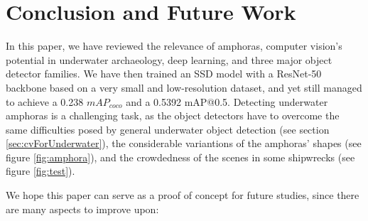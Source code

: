 \documentclass[a4paper, 11pt, oneside]{article}
\begin{document}
  \clearpage

  \section{Conclusion and Future Work}

  In this paper, we have reviewed the relevance of amphoras, computer vision's potential in underwater archaeology, deep
  learning, and three major object detector families. We have then trained an SSD model with a ResNet-50 backbone
  based on a very small and low-resolution dataset, and yet still managed to achieve a 0.238 $mAP_{coco}$ and a 0.5392
  mAP@0.5. Detecting underwater amphoras is a challenging task, as the object detectors have to overcome the same
  difficulties posed by general underwater object detection (see section \ref{sec:cvForUnderwater}), the considerable
  variantions of the amphoras' shapes (see figure \ref{fig:amphora}), and the crowdedness of the scenes in some
  shipwrecks (see figure \ref{fig:test}).

  We hope this paper can serve as a proof of concept for future studies, since there are many aspects to improve upon:
\end{document}

